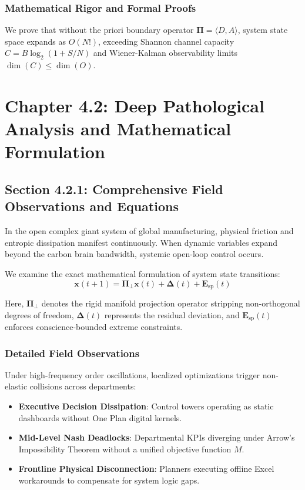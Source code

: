 \documentclass[12pt,a4paper,oneside]{book}
\begin{document}
\subsection*{Mathematical Rigor and Formal Proofs}
We prove that without the priori boundary operator $\mathbf{\Pi} = \langle D, A \rangle$, system state space expands as $O(N!)$, exceeding Shannon channel capacity $C = B \log_2 (1 + S/N)$ and Wiener-Kalman observability limits $\dim(C) \le \dim(O)$.
\clearpage
\chapter{Chapter 4.2: Deep Pathological Analysis and Mathematical Formulation}
\section{Section 4.2.1: Comprehensive Field Observations and Equations}

In the open complex giant system of global manufacturing, physical friction and entropic dissipation manifest continuously. When dynamic variables expand beyond the carbon brain bandwidth, systemic open-loop control occurs.

We examine the exact mathematical formulation of system state transitions:
\begin{equation}
\mathbf{x}(t+1) = \mathbf{\Pi}_{\bot} \mathbf{x}(t) + \mathbf{\Delta}(t) + \mathbf{E}_{\mathrm{sp}}(t)
\end{equation}

Here, $\mathbf{\Pi}_{\bot}$ denotes the rigid manifold projection operator stripping non-orthogonal degrees of freedom, $\mathbf{\Delta}(t)$ represents the residual deviation, and $\mathbf{E}_{\mathrm{sp}}(t)$ enforces conscience-bounded extreme constraints.

\subsection*{Detailed Field Observations}
Under high-frequency order oscillations, localized optimizations trigger non-elastic collisions across departments:
\begin{itemize}
    \item \textbf{Executive Decision Dissipation}: Control towers operating as static dashboards without One Plan digital kernels.
    \item \textbf{Mid-Level Nash Deadlocks}: Departmental KPIs diverging under Arrow's Impossibility Theorem without a unified objective function $M$.
    \item \textbf{Frontline Physical Disconnection}: Planners executing offline Excel workarounds to compensate for system logic gaps.
\end{itemize}
\end{document}
